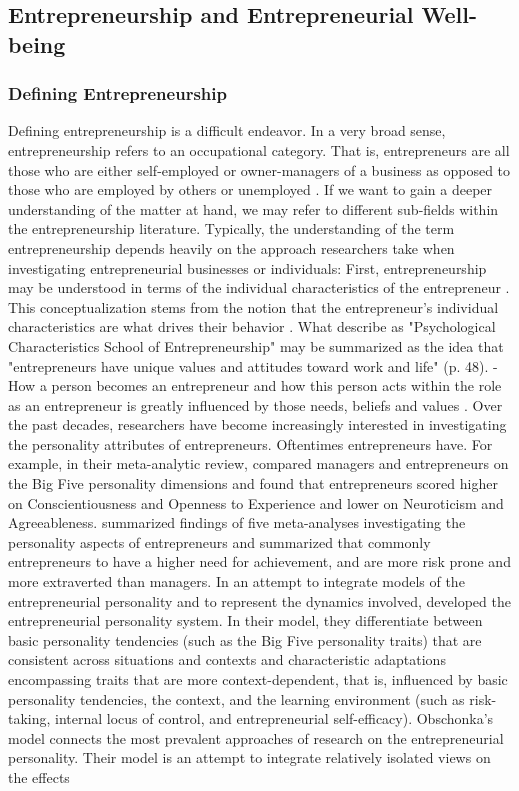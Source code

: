 \documentclass[a4paper,man,natbib]{apa6}
\begin{document}
\subsection{Entrepreneurship and Entrepreneurial Well-being}
\subsubsection{Defining Entrepreneurship}
Defining entrepreneurship is a difficult endeavor. In a very broad sense, entrepreneurship refers to an occupational category. That is, entrepreneurs are all those who are either self-employed or owner-managers of a business as opposed to those who are employed by others or unemployed \citep{Gorgievski2016a, VanPraag2007}. If we want to gain a deeper understanding of the matter at hand, we may refer to different sub-fields within the entrepreneurship literature. Typically, the understanding of the term entrepreneurship depends heavily on the approach researchers take when investigating entrepreneurial businesses or individuals: First, entrepreneurship may be understood in terms of the individual characteristics of the entrepreneur \citep{Bird1988, Rauch2007, Obschonka2017}. This conceptualization stems from the notion that the entrepreneur's individual characteristics are what drives their behavior \citep{Cunningham1991}. What \cite{Cunningham1991} describe as "Psychological Characteristics School of Entrepreneurship" may be summarized as the idea that "entrepreneurs have unique values and attitudes toward work and life" (p. 48). - How a person becomes an entrepreneur and how this person acts within the role as an entrepreneur is greatly influenced by those needs, beliefs and values \cite[p.~48]{Cunningham1991}. Over the past decades, researchers have become increasingly interested in investigating the personality attributes of entrepreneurs. Oftentimes entrepreneurs have. For example, in their meta-analytic review, \cite{Zhao2006} compared managers and entrepreneurs on the Big Five personality dimensions and found that entrepreneurs scored higher on Conscientiousness and Openness to Experience and lower on Neuroticism and Agreeableness. \cite{Brandstatter2011} summarized findings of five meta-analyses investigating the personality aspects of entrepreneurs and summarized that commonly entrepreneurs to have a higher need for achievement, and are more risk prone and more extraverted than managers. In an attempt to integrate models of the entrepreneurial personality and to represent the dynamics involved, \cite{Obschonka2017} developed the entrepreneurial personality system. In their model, they differentiate between basic personality tendencies (such as the Big Five personality traits) that are consistent across situations and contexts and characteristic adaptations encompassing traits that are more context-dependent, that is, influenced by basic personality tendencies, the context, and the learning environment (such as risk-taking, internal locus of control, and entrepreneurial self-efficacy). Obschonka's \citeyearpar{Obschonka2017} model connects the most prevalent approaches of research on the entrepreneurial personality. Their model is an attempt to integrate relatively isolated views on the effects 
\end{document}
